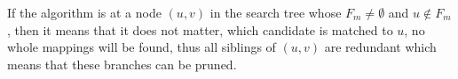 If the algorithm is at a node $(u, v)$ in the search tree whose $F_m \neq \emptyset$ and $u \notin F_m$, then it
means that it does not matter, which candidate is matched to $u$, no whole mappings will be found, thus all siblings
of $(u, v)$ are redundant which means that these branches can be pruned.


